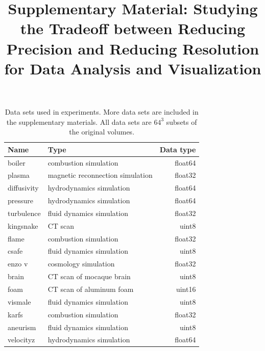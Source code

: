 \documentclass{article}
\title{Supplementary Material: Studying the Tradeoff between Reducing Precision and Reducing Resolution for Data Analysis and Visualization}
\date{}
\begin{document}
\maketitle


\begin{table}[ht]
        \caption{Data sets used in experiments. More data sets are included in the
        supplementary materials. All data sets are $64^3$ subsets of the original volumes.}
  \centering
  \begin{tabular}{llr}
  \toprule
  Name & Type & Data type \\
  \midrule
  boiler & combustion simulation& float64\\
  plasma & magnetic reconnection simulation& float32\\
  diffusivity & hydrodynamics simulation& float64\\
  pressure & hydrodynamics simulation& float64\\
  turbulence & fluid dynamics simulation& float32\\
  kingsnake & CT scan & uint8\\
  flame & combustion simulation& float32\\
  csafe & fluid dynamics simulation& uint8\\
  enzo v & cosmology simulation& float32\\
  brain & CT scan of mocaque brain & uint8\\
  foam & CT scan of aluminum foam & uint16\\
  vismale & fluid dynamics simulation& uint8 \\
  karfs & combustion simulation& float32\\
  aneurism      & fluid dynamics simulation& uint8 \\
  velocityz & hydrodynamics simulation& float64 \\
  \bottomrule
  \end{tabular}\label{tbl:data-sets}
\end{table}
\end{document}
